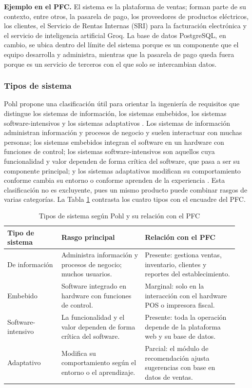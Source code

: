 \documentclass[onecolumn,12pt]{IEEEtran}
\begin{document}
\textbf{Ejemplo en el PFC.} El sistema es la plataforma de ventas; forman parte de su contexto, entre otros, la pasarela de pago, los proveedores de productos el\'ectricos, los clientes, el Servicio de Rentas Internas (SRI) para la facturaci\'on electr\'onica y el servicio de inteligencia artificial Groq. La base de datos PostgreSQL, en cambio, se ubica dentro del l\'imite del sistema porque es un componente que el equipo desarrolla y administra, mientras que la pasarela de pago queda fuera porque es un servicio de terceros con el que solo se intercambian datos.

\subsubsection{Tipos de sistema}
Pohl propone una clasificaci\'on \'util para orientar la ingenier\'ia de requisitos que distingue los sistemas de informaci\'on, los sistemas embebidos, los sistemas software-intensivos y los sistemas adaptativos \cite{pohl2025}. Los sistemas de informaci\'on administran informaci\'on y procesos de negocio y suelen interactuar con muchas personas; los sistemas embebidos integran el software en un hardware con funciones de control; los sistemas software-intensivos son aquellos cuya funcionalidad y valor dependen de forma cr\'itica del software, que pasa a ser su componente principal; y los sistemas adaptativos modifican su comportamiento conforme cambia su entorno o conforme aprenden de la experiencia \cite{pohl2025}. Esta clasificaci\'on no es excluyente, pues un mismo producto puede combinar rasgos de varias categor\'ias. La Tabla \ref{tab:tipos} contrasta los cuatro tipos con el encuadre del PFC.

\begin{table}[htbp]
\caption{Tipos de sistema seg\'un Pohl y su relaci\'on con el PFC}
\label{tab:tipos}
\centering
\footnotesize
\begin{tabular}{@{}p{0.22\linewidth}p{0.34\linewidth}p{0.38\linewidth}@{}}
\toprule
\textbf{Tipo de sistema} & \textbf{Rasgo principal} & \textbf{Relaci\'on con el PFC}\\
\midrule
De informaci\'on & Administra informaci\'on y procesos de negocio; muchos usuarios. & Presente: gestiona ventas, inventario, clientes y reportes del establecimiento.\\
Embebido & Software integrado en hardware con funciones de control. & Marginal: solo en la interacci\'on con el hardware POS o impresora fiscal.\\
Software-intensivo & La funcionalidad y el valor dependen de forma cr\'itica del software. & Presente: toda la operaci\'on depende de la plataforma web y su base de datos.\\
Adaptativo & Modifica su comportamiento seg\'un el entorno o el aprendizaje. & Parcial: el m\'odulo de recomendaci\'on ajusta sugerencias con base en datos de ventas.\\
\bottomrule
\end{tabular}
\end{table}
\end{document}
